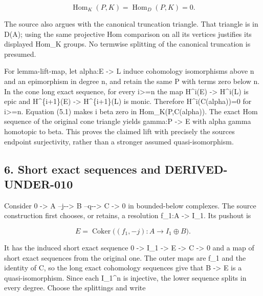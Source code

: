 \[
 \operatorname{Hom}_K(P,K)=\operatorname{Hom}_D(P,K)=0.    \tag{5.1}
\]

The source also argues with the canonical truncation triangle. That triangle is in D(A)\allowbreak{}; using the same projective Hom comparison on all its vertices justifies its displayed Hom\_\allowbreak{}K groups. No termwise splitting of the canonical truncation is presumed.

For lemma-lift-map,\allowbreak{} let alpha:\allowbreak{}E \allowbreak{}-> L induce cohomology isomorphisms above n and an epimorphism in degree n,\allowbreak{} and retain the same P with terms zero below n. In the cone long exact sequence,\allowbreak{} for every i>\allowbreak{}=n the map H\textasciicircum{}i(E)\allowbreak{} \allowbreak{}-> H\textasciicircum{}i(L)\allowbreak{} is epic and H\textasciicircum{}\{i\allowbreak{}+1\}(E)\allowbreak{} \allowbreak{}-> H\textasciicircum{}\{i\allowbreak{}+1\}(L)\allowbreak{} is monic. Therefore H\textasciicircum{}i(C(alpha)\allowbreak{})\allowbreak{}\allowbreak{}=0 for i>\allowbreak{}=n. Equation (5.1)\allowbreak{} makes i beta zero in Hom\_\allowbreak{}K(P,\allowbreak{}C(alpha)\allowbreak{})\allowbreak{}. The exact Hom sequence of the original cone triangle yields gamma:\allowbreak{}P \allowbreak{}-> E with alpha gamma homotopic to beta. This proves the claimed lift with precisely the source\textquotesingle s endpoint surjectivity,\allowbreak{} rather than a stronger assumed quasi-isomorphism.

\subsection{6. Short exact sequences and DERIVED-UNDER-010}\label{proofs-6209-7089-short-exact-sequences-and-derived-under-010}

Consider 0 \allowbreak{}-> A --j-\allowbreak{}-> B --q-\allowbreak{}-> C \allowbreak{}-> 0 in bounded-below complexes. The source construction first chooses,\allowbreak{} or retains,\allowbreak{} a resolution f\_\allowbreak{}1:\allowbreak{}A \allowbreak{}-> I\_\allowbreak{}1. Its pushout is

\[
 E=\operatorname{Coker}\big((f_1,-j):A\longrightarrow I_1\oplus B\big).
                                                               \tag{6.1}
\]

It has the induced short exact sequence 0 \allowbreak{}-> I\_\allowbreak{}1 \allowbreak{}-> E \allowbreak{}-> C \allowbreak{}-> 0 and a map of short exact sequences from the original one. The outer maps are f\_\allowbreak{}1 and the identity of C,\allowbreak{} so the long exact cohomology sequences give that B \allowbreak{}-> E is a quasi-isomorphism. Since each I\_\allowbreak{}1\textasciicircum{}n is injective,\allowbreak{} the lower sequence splits in every degree. Choose the splittings and write


